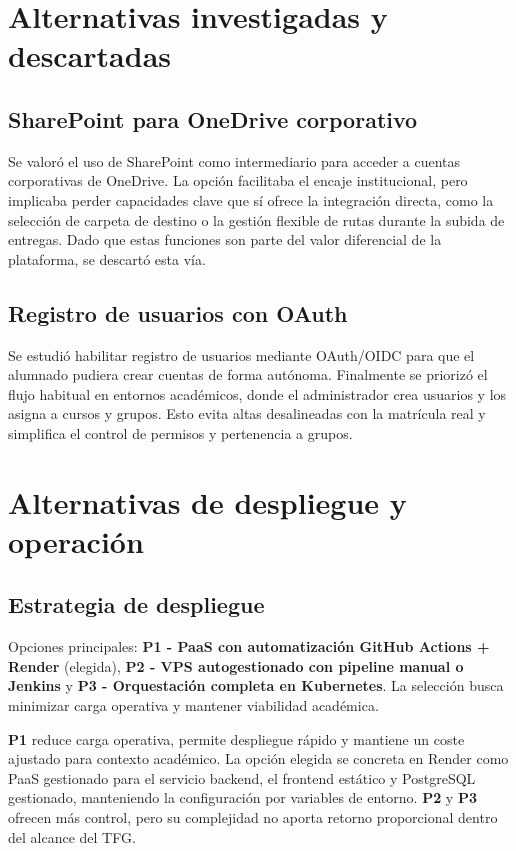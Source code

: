 \FloatBarrier
\section{Alternativas investigadas y descartadas}

\subsection{SharePoint para OneDrive corporativo}

Se valor\'o el uso de SharePoint como intermediario para acceder a cuentas
corporativas de OneDrive. La opci\'on facilitaba el encaje institucional,
pero implicaba perder capacidades clave que s\'i ofrece la integraci\'on directa,
como la selecci\'on de carpeta de destino o la gesti\'on flexible de rutas
durante la subida de entregas. Dado que estas funciones son parte del valor
diferencial de la plataforma, se descart\'o esta v\'ia.

\subsection{Registro de usuarios con OAuth}

Se estudi\'o habilitar registro de usuarios mediante OAuth/OIDC
para que el alumnado pudiera crear cuentas de forma aut\'onoma.
Finalmente se prioriz\'o el flujo habitual en entornos acad\'emicos,
donde el administrador crea usuarios y los asigna a cursos y grupos.
Esto evita altas desalineadas con la matr\'icula real y simplifica el control
de permisos y pertenencia a grupos.

\FloatBarrier
\section{Alternativas de despliegue y operaci\'on}

\subsection{Estrategia de despliegue}

Opciones principales: \textbf{P1 - PaaS con automatizaci\'on GitHub Actions + Render} (elegida), \textbf{P2 - VPS autogestionado con pipeline manual o Jenkins} y \textbf{P3 - Orquestaci\'on completa en Kubernetes}. La selecci\'on busca minimizar carga operativa y mantener viabilidad acad\'emica.

\textbf{P1} reduce carga operativa,
permite despliegue r\'apido y mantiene un coste ajustado para contexto acad\'emico.
La opci\'on elegida se concreta en Render como PaaS gestionado para el servicio
backend, el frontend est\'atico y PostgreSQL gestionado, manteniendo la
configuraci\'on por variables de entorno.
\textbf{P2} y \textbf{P3} ofrecen m\'as control,
pero su complejidad no aporta retorno proporcional dentro del alcance del TFG.

